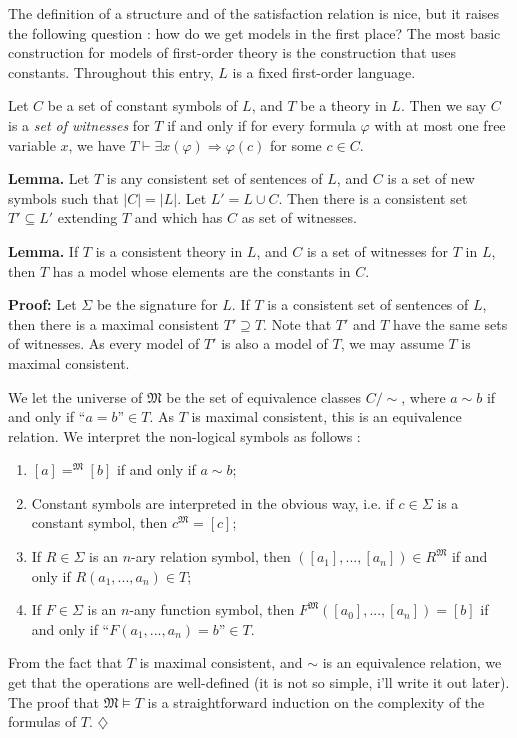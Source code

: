 \documentclass[12pt]{article}
\newcommand{\oq}{\text{``}}
\newcommand{\cq}{\text{''}}
\newcommand{\Implies}{\Rightarrow}
\newcommand{\proves}{\vdash}
\newcommand{\M}{\mathfrak{M}}
\begin{document}

The definition of a structure and of the satisfaction relation is
nice, but it raises the following question : how do we get models in
the first place?  The most basic construction for models of
first-order theory is the construction that uses constants. Throughout
this entry, $L$ is a fixed first-order language.

Let $C$ be a set of constant symbols of $L$, and $T$ be a theory in
$L$.  Then we say $C$ is a {\em set of witnesses} for $T$ if and only
if for every formula $\varphi$ with at most one free variable $x$, 
we have $T\proves\exists x(\varphi)\Implies\varphi(c)$ for some $c\in C$.

{\bf Lemma.}
Let $T$ is any consistent 
set of sentences of $L$, and $C$ is a set of new symbols
such that $|C|=|L|$.  Let $L'=L\cup C$.  Then there is a consistent
set $T'\subseteq L'$ extending $T$ and which has $C$ as set of
witnesses.

{\bf Lemma.}
If $T$ is a consistent theory in $L$, and $C$ is a set of witnesses
for $T$ in $L$, then $T$ has a model whose elements are the constants
in $C$.

{\bf Proof:}
Let $\Sigma$ be the signature for $L$.  If $T$ is a consistent set of
sentences of $L$, then there is a maximal consistent $T'\supseteq T$.
Note that $T'$ and $T$ have the same sets of witnesses.  As every
model of $T'$ is also a model of $T$, we may assume $T$ is maximal
consistent.

We let the universe of $\M$ be the set of equivalence classes
$C/\sim$, where $a\sim b$ if and only if $\oq a=b\cq\in T$.  As $T$ is
maximal consistent, this is an equivalence relation.  We interpret the
non-logical symbols as follows :
\begin{enumerate}
\item $[a]=^\M[b]$ if and only if $a\sim b$;
\item Constant symbols are interpreted in the obvious way, i.e. if
  $c\in \Sigma$ is a constant symbol, then $c^\M=[c]$;
\item If $R\in\Sigma$ is an $n$-ary relation symbol, then
  $([a_1],...,[a_n])\in R^\M$ if and only if $R(a_1,...,a_n)\in T$;
\item If $F\in\Sigma$ is an $n$-any function symbol, then
  $F^\M([a_0],...,[a_n])=[b]$ if and only if $\oq
  F(a_1,...,a_n)=b\cq\in T$.
\end{enumerate}
From the fact that $T$ is maximal consistent, and $\sim$ is an
equivalence relation, we get that the operations are well-defined (it
is not so simple, i'll write it out later).
The proof that $\M\models T$ is a straightforward induction on the
complexity of the formulas of $T$.
\hfill$\diamondsuit$
\end{document}
